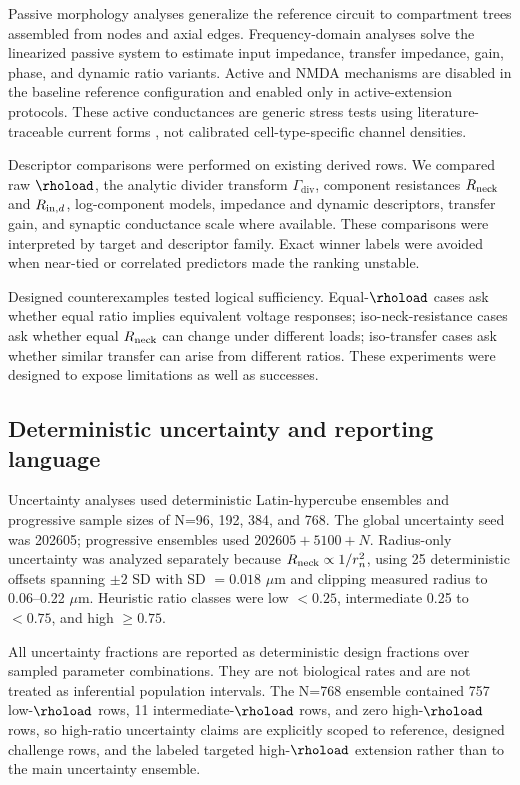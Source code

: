 Passive morphology analyses generalize the reference circuit to compartment trees assembled from nodes and axial edges. Frequency-domain analyses solve the linearized passive system to estimate input impedance, transfer impedance, gain, phase, and dynamic ratio variants. Active and NMDA mechanisms are disabled in the baseline reference configuration and enabled only in active-extension protocols. These active conductances are generic stress tests using literature-traceable current forms \citep{HodgkinHuxley1952,MayerWestbrookGuthrie1984,JahrStevens1990,Magee1998,Magee1999,ConnorStevens1971,HuguenardMcCormick1992}, not calibrated cell-type-specific channel densities.

Descriptor comparisons were performed on existing derived rows. We compared raw $\rhoload$, the analytic divider transform $\Gamma_{\mathrm{div}}$, component resistances $R_{\mathrm{neck}}$ and $R_{\mathrm{in},d}$, log-component models, impedance and dynamic descriptors, transfer gain, and synaptic conductance scale where available. These comparisons were interpreted by target and descriptor family. Exact winner labels were avoided when near-tied or correlated predictors made the ranking unstable.

Designed counterexamples tested logical sufficiency. Equal-$\rhoload$ cases ask whether equal ratio implies equivalent voltage responses; iso-neck-resistance cases ask whether equal $R_{\mathrm{neck}}$ can change under different loads; iso-transfer cases ask whether similar transfer can arise from different ratios. These experiments were designed to expose limitations as well as successes.

\subsection{Deterministic uncertainty and reporting language}

Uncertainty analyses used deterministic Latin-hypercube ensembles and progressive sample sizes of N=96, 192, 384, and 768. The global uncertainty seed was 202605; progressive ensembles used $202605+5100+N$. Radius-only uncertainty was analyzed separately because $R_{\mathrm{neck}}\propto1/r_n^2$, using 25 deterministic offsets spanning $\pm2$ SD with SD $=0.018$ $\mu$m and clipping measured radius to 0.06--0.22 $\mu$m. Heuristic ratio classes were low $<0.25$, intermediate 0.25 to $<0.75$, and high $\geq0.75$.

All uncertainty fractions are reported as deterministic design fractions over sampled parameter combinations. They are not biological rates and are not treated as inferential population intervals. The N=768 ensemble contained 757 low-$\rhoload$ rows, 11 intermediate-$\rhoload$ rows, and zero high-$\rhoload$ rows, so high-ratio uncertainty claims are explicitly scoped to reference, designed challenge rows, and the labeled targeted high-$\rhoload$ extension rather than to the main uncertainty ensemble.

